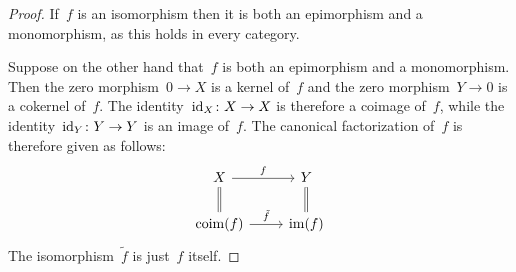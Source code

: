 \begin{proof}
  If~$f$ is an isomorphism then it is both an epimorphism and a monomorphism, as this holds in every category.
  
  Suppose on the other hand that~$f$ is both an epimorphism and a monomorphism.
  Then the zero morphism~$0 \to X$ is a kernel of~$f$ and the zero morphism~$Y \to 0$ is a cokernel of~$f$.
  The identity~$\operatorname{id}_X \colon X \to X$ is therefore a coimage of~$f$, while the identity~$\operatorname{id}_Y \colon Y \to Y$ is an image of~$f$.
  The canonical factorization of~$f$ is therefore given as follows:
  \[
    \begin{tikzcd}
        X
        \arrow{r}[above]{f}
        \arrow[equal]{d}
      & Y
        \arrow[equal]{d}
      \\
        \coim(f)
        \arrow{r}[above]{\tilde{f}}
      & \im(f)
    \end{tikzcd}
  \]
  The isomorphism~$\tilde{f}$ is just~$f$ itself.
\end{proof}




